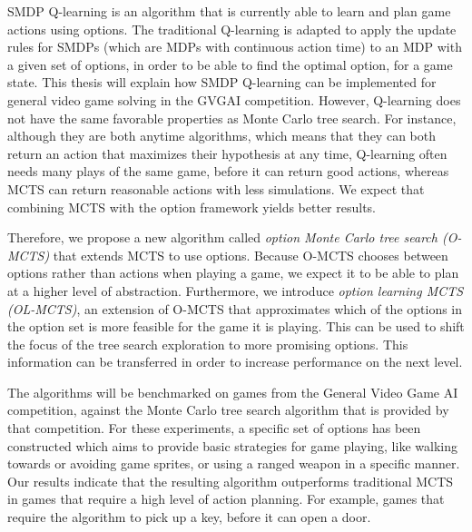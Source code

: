 SMDP Q-learning is an algorithm that is currently able to learn and plan game
actions using options. The traditional Q-learning is adapted to apply the update
rules for SMDPs (which are MDPs with continuous action time) to an MDP with a
given set of options, in order to be able to find the optimal option, for a game
state. This thesis will explain how SMDP Q-learning can be implemented for
general video game solving in the GVGAI competition. 
However, Q-learning does not have the same favorable properties as Monte Carlo
tree search. For instance, although they are both anytime algorithms, which
means that they can both return an action that maximizes their hypothesis at any
time, Q-learning often needs many plays of the same game, before it can return
good actions, whereas MCTS can return reasonable actions with less simulations.
We expect that combining MCTS with the option framework yields better results.

Therefore, we propose a new algorithm called \emph{option Monte Carlo tree
search (O-MCTS)} that extends MCTS to use options. Because O-MCTS chooses
between options rather than actions when playing a game, we expect it to be able
to plan at a higher level of abstraction. Furthermore, we introduce \emph{option
learning MCTS (OL-MCTS)}, an extension of O-MCTS that approximates which of the
options in the option set is more feasible for the game it is playing. This can
be used to shift the focus of the tree search exploration to more promising
options. This information can be transferred in order to increase performance on
the next level.

The algorithms will be benchmarked on games from the General Video Game AI
competition, against the Monte Carlo tree search algorithm that is
provided by that competition. For these experiments, a specific set of options
has been constructed which aims to provide basic strategies for game playing,
like walking towards or avoiding game sprites, or using a ranged weapon in a
specific manner. Our results indicate that the resulting algorithm outperforms
traditional MCTS in games that require a high level of action planning. For
example, games that require the algorithm to pick up a key, before it can open a
door. 
